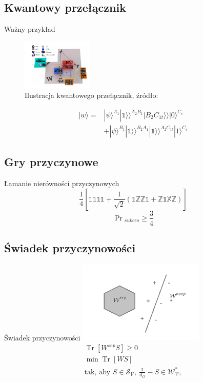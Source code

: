 \documentclass{beamer}
\newcommand{\Ket}[1]{|#1\rangle}
\newcommand{\KKet}[1]{|#1\rangle\rangle}
\newcommand{\X}{\mathbb{X}}
\newcommand{\Z}{\mathbb{Z}}
\newcommand{\I}{\mathbb{1}}
\DeclareMathOperator{\Trs}{Tr}
\begin{document}
\subsection{Kwantowy przełącznik}
\begin{frame}{Ważny przykład}
\centering
\begin{figure}
\includegraphics[width=0.3\textwidth]{obrazki/qs}
\caption{Ilustracja kwantowego przełącznik, źródło: \cite{experiment}}
\end{figure}
\begin{equation}
\begin{split}
\Ket{w} =& \Ket{\psi}^{A_1}\KKet{\I}^{A_2B_1}\KKet{B_2C_{1t}}\Ket{0}^{C_c}\\
&+ \Ket{\psi}^{B_1}\KKet{\I}^{B_2A_1}\KKet{\I}^{A_2C_{1t}}\Ket{1}^{C_c}
\end{split}
\end{equation}
\end{frame}
\subsection{Gry przyczynowe}
\begin{frame}{Łamanie nierówności przyczynowych}
\centering
\begin{equation}
\frac{1}{4}\left[
\I\I\I\I + \frac{1}{\sqrt{2}}(\I\Z\Z\I + \Z\I\X\Z)
\right]
\end{equation}
\begin{equation}
\Pr{}_{sukces} \geq \frac{3}{4}
\end{equation}
\end{frame}
\subsection{Świadek przyczynowości}
\begin{frame}{Świadek przyczynowości}
\centering
\includegraphics[width=0.45\textwidth]{obrazki/hip}
\begin{gather}
\Trs\left[ W^{sep}S\right] \geq 0 \\
\min \Trs \left[ WS \right]\\
\text{tak, aby } S \in \mathcal{S_V},~ \frac{\I}{d_O} - S \in \mathcal{W^*_V},
\end{gather}
\end{frame}

\begin{frame}[allowframebreaks]
  


\end{frame}
\end{document}
